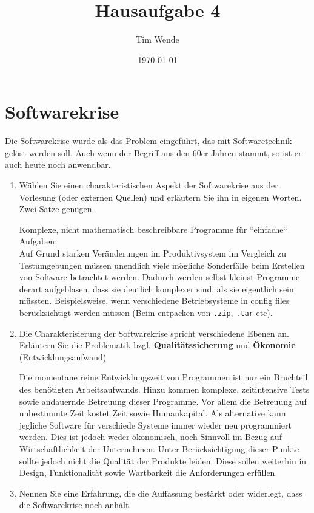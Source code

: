 \documentclass{article}
\author{Tim Wende}
\date{\today}
\title{\textbf{Hausaufgabe 4}}
\begin{document}
    \maketitle

    \newpage
    \section{Softwarekrise}
    Die Softwarekrise wurde als das Problem eingeführt, das mit Softwaretechnik gelöst werden soll.
    Auch wenn der Begriff aus den 60er Jahren stammt, so ist er auch heute noch anwendbar.

    \begin{enumerate}[label=\alph*.]
        \item Wählen Sie einen charakteristischen Aspekt der Softwarekrise aus der Vorlesung (oder externen Quellen) und erläutern Sie ihn in eigenen Worten.
            Zwei Sätze genügen.
            
            Komplexe, nicht mathematisch beschreibbare Programme für “einfache“ Aufgaben:\\
            Auf Grund starken Veränderungen im Produktivsystem im Vergleich zu Testumgebungen müssen unendlich viele mögliche Sonderfälle beim Erstellen von Software betrachtet werden.
            Dadurch werden selbst kleinst-Programme derart aufgeblasen, dass sie deutlich komplexer sind, als sie eigentlich sein müssten.
            Beispielsweise, wenn verschiedene Betriebsysteme in config files berücksichtigt werden müssen (Beim entpacken von \texttt{.zip}, \texttt{.tar} etc).
        \item Die Charakterisierung der Softwarekrise spricht verschiedene Ebenen an.
            Erläutern Sie die Problematik bzgl. \textbf{Qualitätssicherung} und \textbf{Ökonomie} (Entwicklungsaufwand)
            
            Die momentane reine Entwicklungszeit von Programmen ist nur ein Bruchteil des benötigten Arbeitsaufwands.
            Hinzu kommen komplexe, zeitintensive Tests sowie andauernde Betreuung dieser Programme.
            Vor allem die Betreuung auf unbestimmte Zeit kostet Zeit sowie Humankapital.
            Als alternative kann jegliche Software für verschiede Systeme immer wieder neu programmiert werden.
            Dies ist jedoch weder ökonomisch, noch Sinnvoll im Bezug auf Wirtschaftlichkeit der Unternehmen.
            Unter Berücksichtigung dieser Punkte sollte jedoch nicht die Qualität der Produkte leiden.
            Diese sollen weiterhin in Design, Funktionalität sowie Wartbarkeit die Anforderungen erfüllen.
        \item Nennen Sie eine Erfahrung, die die Auffassung bestärkt oder widerlegt, dass die Softwarekrise noch anhält.
            

\end{enumerate}
\end{document}

